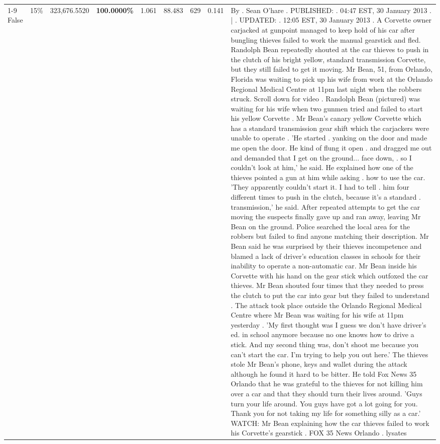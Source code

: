 \begin{table}[H]
\begin{tabular}{lllrlllll}
\cline{1-9} \cline{2-9}
False & 15\% & 323,676.5520 & \bfseries \color{red} 100.0000\% & 1.061 & 88.483 & 629 & 0.141 & By . Sean O'hare . PUBLISHED: . 04:47 EST, 30 January 2013 . | . UPDATED: . 12:05 EST, 30 January 2013 . A Corvette owner carjacked at gunpoint managed to keep hold of his car after bungling thieves failed to work the manual gearstick and fled. Randolph Bean repeatedly shouted at the car thieves to push in the clutch of his bright yellow, standard transmission Corvette, but they still failed to get it moving. Mr Bean, 51, from Orlando, Florida was waiting to pick up his wife from work at the Orlando Regional Medical Centre at 11pm last night when the robbers struck. Scroll down for video . Randolph Bean (pictured) was waiting for his wife when two gunmen tried and failed to start his yellow Corvette . Mr Bean's canary yellow Corvette which has a standard transmission gear shift which the carjackers were unable to operate . 'He started . yanking on the door and made me open the door. He kind of flung it open . and dragged me out and demanded that I get on the ground... face down, . so I couldn't look at him,' he said. He explained how one of the thieves pointed a gun at him while asking . how to use the car. 'They apparently couldn't start it. I had to tell . him four different times to push in the clutch, because it's a standard . transmission,' he said. After repeated attempts to get the car moving the suspects finally gave up and ran away, leaving Mr Bean on the ground. Police searched the local area for the robbers but failed to find anyone matching their description. Mr Bean said he was surprised by their thieves incompetence and blamed a lack of driver's education classes in schools for their inability to operate a non-automatic car. Mr Bean inside his Corvette with his hand on the gear stick which outfoxed the car thieves. Mr Bean shouted four times that they needed to press the clutch to put the car into gear but they failed to understand . The attack took place outside the Orlando Regional Medical Centre where Mr Bean was waiting for his wife at 11pm yesterday . 'My first thought was I guess we don't have driver's ed. in school anymore because no one knows how to drive a stick. And my second thing was, don't shoot me because you can't start the car. I'm trying to help you out here.' The thieves stole Mr Bean's phone, keys and wallet during the attack although he found it hard to be bitter. He told Fox News 35 Orlando that he was grateful to the thieves for not killing him over a car and that they should turn their lives around. 'Guys turn your life around. You guys have got a lot going for you. Thank you for not taking my life for something silly as a car.' WATCH: Mr Bean explaining how the car thieves failed to work his Corvette's gearstick . FOX 35 News Orlando . lysates \\

\end{tabular}
\end{table}
